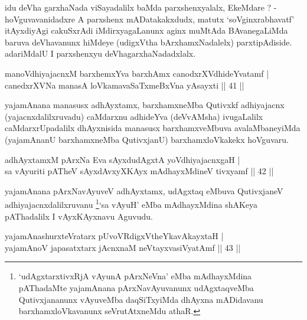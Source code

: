 \begin{artha}
idu deVha garxhaNada viSayadalilx baMda parxshenxyalalx, EkeMdare ? - hoVguvavanidadxre A parxshenx mADatakakxdudx, matutx `soV\s ginxrabhavatf' itAyxdiyAgi cakuSxrAdi iMdirxyagaLanunx aginx muMtAda BAvanegaLiMda baruva deVhavanunx hiMdeye (udigxVtha bArxhamxNadalelx) parxtipAdiside. adariMdalU I parxshenxyu deVhagarxhaNadadxlalx.
\end{artha}


\begin{shl}
manoV\s dhiyajacnxM barxhemxYva barxhAmx canodxrXV\s dhideYvatamf |\\
canedxrXVNa manasA loVkamavaSaTxmeBxVna yAsayxti \hfill || 41 || 
\end{shl}

\begin{artha}
yajamAnana manasusx adhAyxtamx, barxhamxneMba Qutivxkf adhiyajacnx (yajacnxdalilx\-ruvadu) caMdarxnu adhideYva (deVvAMsha) ivugaLalilx caMdarxrUpadalilx dhAyxnisida manasusx barxhamxveMbuva avalaMbaneyiMda (yajamAnanU barxhamxneMba QutivxjanU) barxhamxloVkakekx hoVguvaru.
\end{artha}

\begin{shl}
adhAyxtamxM pArxNa Eva sAyxdudAgxtA yoV\s dhiyajacnxgaH |\\
sa vAyuriti pATheV sAyxdAvxyXKAyx mAdhayxMdineV tivxyamf \hfill || 42 ||
\end{shl}

\begin{artha}
yajamAnana pArxNavAyuveV adhAyxtamx, udAgxtaq eMbuva QutivxjaneV adhiyajacnxdalilxruvanu \footnote[1]{`udAgxtarxtivxRjA vAyunA pArxNeVna' eMba mAdhayxMdina pAThadaMte yajamAnana pArxNavAyuvanunx udAgxtaqveMba Qutivxjananunx vAyuveMba daqSiTxyiMda dhAyxna mADidavanu barxhamxloVkavanunx seVrutAtxneMdu athaR.}`sa vAyuH' eMba mAdhayxMdina shAKeya pAThadalilx I vAyxKAyxnavu Aguvudu.
\end{artha}


\begin{shl}
yajamAnashurxteVratarx pUvoVRdigxVtheYkavAkayxtaH |\\
yajamAnoV japasatxtarx jAcnxnaM neVtayxvasiVyatAmf \hfill || 43 ||
\end{shl}

